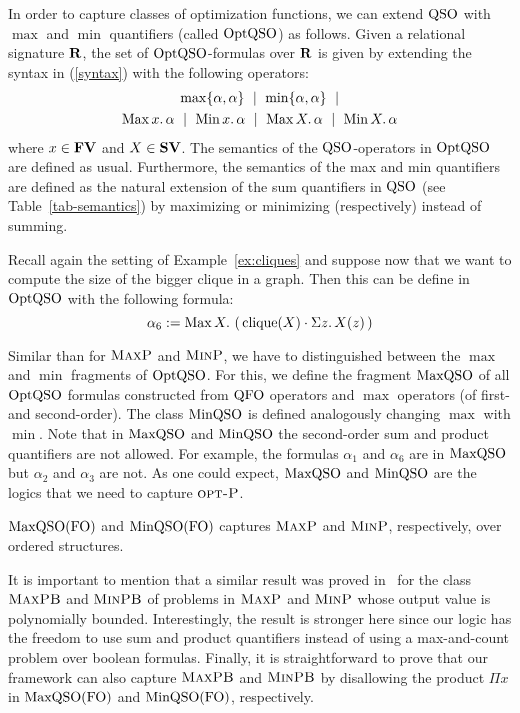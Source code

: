 In order to capture classes of optimization functions, we can extend ${\rm QSO}$ with $\max$ and $\min$ quantifiers (called ${\rm OptQSO}$) as follows. 
Given a relational signature $\mathbf{R}$, the set of ${\rm OptQSO}$-formulas over $\mathbf{R}$ is given by extending the syntax in (\ref{syntax}) with the following operators:
\begin{multline*}
\max\{\alpha,\alpha\} \ \mid\ \min\{\alpha,\alpha\} \ \mid \\ \maxa{x} \alpha \ \mid \ \mina{x} \alpha \ \mid \ \maxa{X} \alpha \ \mid \ \mina{X} \alpha 
\end{multline*}
where $x \in \mathbf{FV}$ and $X \in \mathbf{SV}$. The semantics of the ${\rm QSO}$-operators in ${\rm OptQSO}$ are defined as usual. Furthermore, the semantics of the max and min quantifiers are defined as the natural extension of the sum quantifiers in ${\rm QSO}$ (see Table~\ref{tab-semantics}) by maximizing or minimizing (respectively) instead of summing.
\begin{example}\label{ex:optqso}
	Recall again the setting of Example~\ref{ex:cliques} and suppose now that we want to compute the size of the bigger clique in a graph. Then this can be define in ${\rm OptQSO}$ with the following formula:
	\[
\alpha_6 := \operatorname{Max}{X}.\, \left( \, \operatorname{clique}(X) \cdot \Sigma{z}.\, X(z)  \, \right)
	\]
\end{example}
Similar than for $\text{\sc MaxP}$ and $\text{\sc MinP}$, we have to distinguished between the $\max$ and $\min$ fragments of ${\rm OptQSO}$. For this, we define the fragment ${\rm MaxQSO}$ of all ${\rm OptQSO}$ formulas constructed from ${\rm QFO}$ operators and $\max$ operators (of first- and second-order). The class ${\rm MinQSO}$ is defined analogously changing $\max$ with $\min$. Note that in ${\rm MaxQSO}$ and ${\rm MinQSO}$ the second-order sum and product quantifiers are not allowed. For example, the formulas $\alpha_1$ and $\alpha_6$ are in ${\rm MaxQSO}$ but $\alpha_2$ and $\alpha_3$ are not. As one could expect, ${\rm MaxQSO}$ and ${\rm MinQSO}$ are the logics that we need to capture $\text{\sc opt-P}$.
\begin{theorem} \label{theo:capture-optp}
	${\rm MaxQSO}({\rm FO})$ and ${\rm MinQSO}({\rm FO})$ captures $\text{\sc MaxP}$ and $\text{\sc MinP}$, respectively, over ordered structures.
\end{theorem}
It is important to mention that a similar result was proved in~\cite{kolaitis1994logical} for the class $\text{\sc MaxPB}$ and $\text{\sc MinPB}$ of problems in $\text{\sc MaxP}$ and $\text{\sc MinP}$ whose output value is polynomially bounded.
Interestingly, the result is stronger here since our logic has the freedom to use sum and product quantifiers instead of using a max-and-count problem over boolean formulas. 
Finally, it is straightforward to prove that our framework can also capture $\text{\sc MaxPB}$ and $\text{\sc MinPB}$ by disallowing the product $\Pi x$ in ${\rm MaxQSO}({\rm FO})$ and ${\rm MinQSO}({\rm FO})$, respectively.

